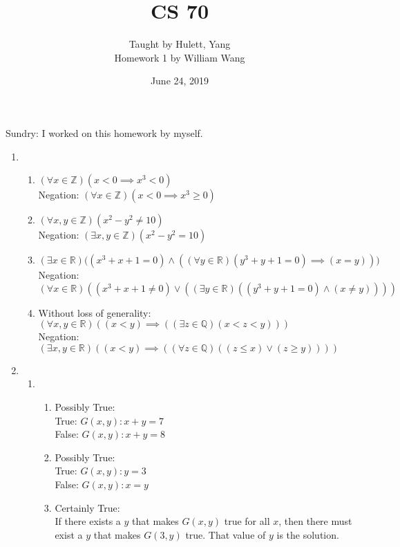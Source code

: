 \documentclass[a4paper]{article}
\title{\textbf{CS 70}}
\author{\large Taught by Hulett, Yang\\
Homework 1 by William Wang}
\date{June 24, 2019}
\newcommand{\R}{\mathbb{R}}
\newcommand{\Z}{\mathbb{Z}}
\newcommand{\Q}{\mathbb{Q}}
\newcommand{\<}{\langle}
\renewcommand{\>}{\rangle}
\renewcommand{\^}{\wedge}
\renewcommand{\v}{\vee}
\begin{document}
\maketitle

\newpage
Sundry: I worked on this homework by myself.
\begin{enumerate}
    \item 
        \begin{enumerate}
            \item $(\forall x \in \Z)(x < 0 \implies x^3 < 0)$\\
            Negation: $(\forall x \in \Z)(x < 0 \implies x^3 \geq 0)$
            \item $(\forall x,y \in \Z)(x^2 - y^2 \neq 10)$\\
            Negation: $(\exists x,y \in \Z)(x^2 - y^2 = 10)$
            \item $(\exists x \in \R)\big((x^3 + x + 1 = 0) \^ ((\forall y \in \R)(y^3 + y + 1 = 0) \implies (x = y))\big)$\\
            Negation: $(\forall x \in \R)((x^3 + x + 1 \neq 0) \v ((\exists y \in \R)((y^3 + y + 1 = 0) \^ (x \neq y))))$
            \item Without loss of generality: \\
            $(\forall x,y \in \R)((x < y)\implies((\exists z \in \Q)(x < z < y)))$\\
            Negation: $(\exists x,y \in \R)((x < y) \implies ((\forall z \in \Q)((z \leq x) \v (z \geq y))))$
        \end{enumerate}
    \item 
        \begin{enumerate}
            \item 
                \begin{enumerate}
                    \item Possibly True:\\ 
                        True: $G(x,y): x + y = 7$\\
                        False: $G(x,y): x + y = 8$
                    \item Possibly True:\\
                        True: $G(x,y): y = 3$\\
                        False: $G(x,y): x = y$
                    \item Certainly True:\\
                        If there exists a $y$ that makes $G(x,y)$ true for all $x$, then there must exist a $y$ that makes $G(3,y)$ true. That value of $y$ is the solution.

\end{enumerate}
\end{enumerate}
\end{enumerate}
\end{document}
